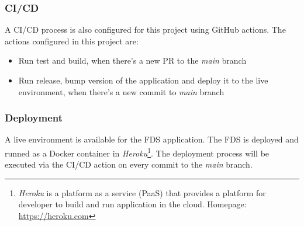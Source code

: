   \subsubsection{CI/CD}
  A CI/CD process is also configured for this project using GitHub actions. The actions configured in this project are:

   \begin{itemize}
    \item Run test and build, when there's a new PR to the \emph{main} branch
    \item Run release, bump version of the application and deploy it to the live environment, when there's a new commit to \emph{main} branch
   \end{itemize}
   
  \subsubsection{Deployment}
  A live environment is available for the FDS application. The FDS is deployed and runned as a Docker container in \emph{Heroku}\footnote{\emph{Heroku} is a platform as a service (PaaS) that provides a platform for developer to build and run application in the cloud. Homepage: \url{https://heroku.com}}. The deployment process will be executed via the CI/CD action on every commit to the \emph{main} branch. 

 
